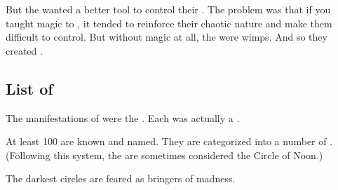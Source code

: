 But the \banes{} wanted a better tool to control their \humans{}. The problem was that if you taught \itzach{} magic to \humans{}, it tended to reinforce their chaotic nature and make them difficult to control. But without magic at all, the \humans{} were wimps. 
And so they created . 








\subsection{List of \Qliphoth}
The manifestations of \itzach were the . 
Each \qliphah was actually a \banelord. 

At least 100 \qliphoth{} are known and named. 
They are categorized into a number of . 
(Following this system, the  are sometimes considered the Circle of Noon.) 

The darkest circles are feared as bringers of madness.






